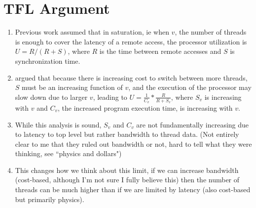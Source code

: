 \section{TFL Argument}

\begin{enumerate}

\item Previous work assumed that in saturation, ie when $v$, the
    number of threads is enough to cover the latency of a remote
    access, the processor utilization is $U=R/(R+S)$, where $R$ is the
    time between remote accesses and $S$ is synchronization time.
    
\item \cite{culler:93} argued that because there is increasing cost to
    switch between more threads, $S$ must be an increasing function of
    $v$, and the execution of the processor may slow down due to larger
    $v$, leading to $U= \frac{1}{C_v} * \frac{R}{R+S_v}$, where $S_v$ is increasing
    with $v$ and $C_v$, the increased program execution time, is increasing with
    $v$.

\item While this analysis is sound, $S_v$ and $C_v$ are not fundamentally
    increasing due to latency to top level but rather bandwidth to
    thread data. (Not entirely clear to me that they ruled out
    bandwidth or not, hard to tell what they were thinking, see
    ``physics and dollars")

\item This changes how we think about this limit, if we can increase
    bandwidth (cost-based, although I’m not sure I fully believe this)
    then the number of threads can be much higher than if we are
    limited by latency (also cost-based but primarily physics). 

\end{enumerate}
